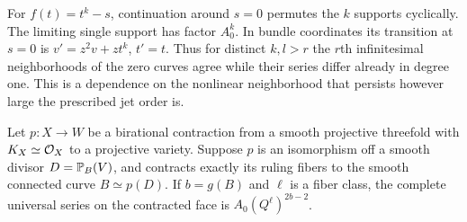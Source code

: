 For $f(t)=t^k-s$, continuation around $s=0$ permutes the $k$ supports
cyclically. The limiting single support has factor $A_0^k$. In bundle
coordinates its transition at $s=0$ is
$v'=z^2v+zt^k$, $t'=t$. Thus for distinct $k,l>r$ the $r$th
infinitesimal neighborhoods of the zero curves agree while their series
differ already in degree one. This is a dependence on the nonlinear
neighborhood that persists however large the prescribed jet order is.

\begin{proposition}\label{prop:ruled}
Let $p:X\to W$ be a birational contraction from a smooth projective
threefold with $K_X\simeq\mathcal O_X$ to a projective variety. Suppose $p$ is an
isomorphism off a smooth divisor $D=\mathbb P_B(V)$, and contracts exactly
its ruling fibers to the smooth connected curve $B\simeq p(D)$. If $b=g(B)$ and
$\ell$ is a fiber class, the complete universal series on the contracted
face is $A_0(Q^\ell)^{2b-2}$.
\end{proposition}
